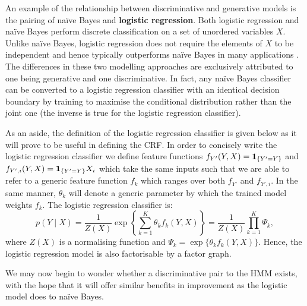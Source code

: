 \documentclass[../main.tex]{subfiles}
\begin{document}
An example of the relationship between discriminative and generative models is the pairing of na{\"i}ve Bayes and \textbf{logistic regression}.
Both logistic regression and na{\"i}ve Bayes perform discrete classification on a set of unordered variables $X$. Unlike na{\"i}ve Bayes, logistic regression does not require the elements of $X$ to be independent and hence typically outperforms na{\"i}ve Bayes in many applications \autocite{log-reg-vs-nb}.
The differences in these two modelling approaches are exclusively attributed to one being generative and one discriminative.
In fact, any na{\"i}ve Bayes classifier can be converted to a logistic regression classifier with an identical decision boundary by training to maximise the conditional distribution rather than the joint one (the inverse is true for the logistic regression classifier).

As an aside, the definition of the logistic regression classifier is given below as it will prove to be useful in defining the CRF.
In order to concisely write the logistic regression classifier we define feature functions $f_{Y'}(Y,X)=\mathbf{1}_{\{Y'=Y\}}$ and $f_{Y',i}(Y,X)=\mathbf{1}_{\{Y'=Y\}}X_i$ which take the same inputs such that we are able to refer to a generic feature function $f_k$ which ranges over both $f_{Y'}$ and $f_{Y',i}$.
In the same manner, $\theta_k$ will denote a generic parameter by which the trained model weights $f_k$. The logistic regression classifier is:
\begin{equation*}
     p(Y \mid X) = \frac{1}{Z(X)} \exp \left\{ \sum_{k=1}^K \theta_k f_k(Y,X) \right\} = \frac{1}{Z(X)} \prod_{k=1}^K \Psi_k,
\end{equation*}
where $Z(X)$ is a normalising function and $\Psi_k = \exp \{ \theta_k f_k(Y,X) \}$. Hence, the logistic regression model is also factorisable by a factor graph.

We may now begin to wonder whether a discriminative pair to the HMM exists, with the hope that it will offer similar benefits in improvement as the logistic model does to na{\"i}ve Bayes.
\end{document}
